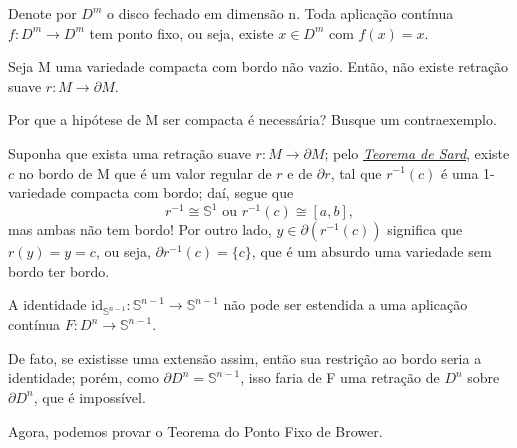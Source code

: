 \documentclass[../differential_topology.tex]{subfiles}
\begin{document}
\hypertarget{brower_fpt}{
	\begin{theorem*}
		Denote por \(D^{m}\) o disco fechado em dimensão n. Toda aplicação contínua \(f:D^{m}\rightarrow D^{m}\) tem ponto fixo, ou seja, existe \(x\in D^{m}\) com \(f(x)=x\).
	\end{theorem*}
}
\begin{lemma*}
	Seja M uma variedade compacta com bordo não vazio. Então, não existe retração suave \(r:M\rightarrow \partial M\).
\end{lemma*}
\begin{exr}
	Por que a hipótese de M ser compacta é necessária? Busque um contraexemplo.
\end{exr}
\begin{proof*}
	Suponha que exista uma retração suave \(r : M\rightarrow \partial M\); pelo \hyperlink{sard_theorem}{\textit{Teorema de Sard}}, existe \(c\) no bordo de M que é um valor regular de \(r \) e de \(\partial r \), tal que \(r^{-1}(c)\) é uma 1-variedade compacta com bordo; daí, segue que
	\[
		r^{-1}\cong \mathbb{S}^{1} \text{ ou } r^{-1}(c)\cong [a, b],
	\]
	mas ambas não tem bordo! Por outro lado, \(y\in \partial (r^{-1}(c))\) significa que \(r(y) = y = c\), ou seja, \(\partial r^{-1}(c)= \{c\}\), que é um absurdo uma variedade sem bordo ter bordo. \qedsymbol
\end{proof*}
\begin{crl*}
	A identidade \(\mathrm{id}_{\mathbb{S}^{n-1}}:\mathbb{S}^{n-1}\rightarrow \mathbb{S}^{n-1}\) não pode ser estendida a uma aplicação contínua \(F:D^{n}\rightarrow \mathbb{S}^{n-1}\).
\end{crl*}
\begin{proof*}
	De fato, se existisse uma extensão assim, então sua restrição ao bordo seria a identidade; porém, como \(\partial D^{n} = \mathbb{S}^{n-1}\), isso faria de F uma retração de \(D^{n}\) sobre \(\partial D^{n}\), que é impossível. \qedsymbol
\end{proof*}

Agora, podemos provar o Teorema do Ponto Fixo de Brower.
\end{document}
